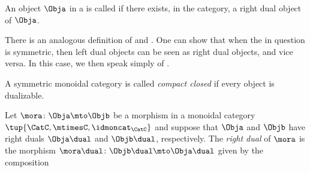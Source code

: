 \begin{ctdefinition}\label{def:right-dualizable}
    An object $\Obja$ in a  is called  if there exists, in the category, a right dual object of $\Obja$.
\end{ctdefinition}

\begin{remark}\label{rem:left-dualizability}
    There is an analogous definition of  and .
    One can show that when the  in question is symmetric, then left dual objects can be seen as right dual objects, and vice versa.
    In this case, we then speak simply of .
\end{remark}

\begin{ctdefinition}
    \label{def:compact-closed-category}
    A symmetric monoidal category is called \emph{compact closed} if every object is dualizable.
\end{ctdefinition}


\begin{ctdefinition}\label{def:dual-morphism}
    Let $\mora \colon \Obja \mto \Objb$ be a morphism in a monoidal category $\tup{\CatC,\mtimesC,\idmoncat_{\CatC}}$ and suppose that $\Obja$ and $\Objb$ have right duals $\Obja\dual$ and $\Objb\dual$, respectively.
    The \emph{right dual} of $\mora$ is the morphism $\mora\dual \colon \Objb\dual \mto \Obja\dual$ given by the composition
\end{ctdefinition}

